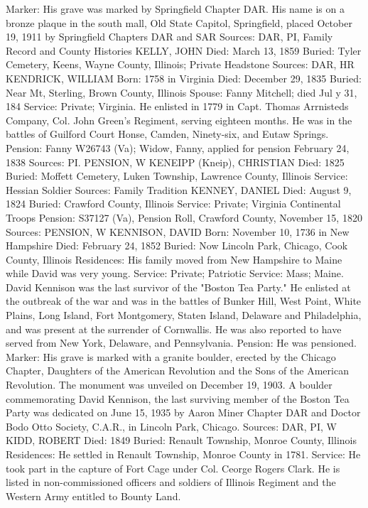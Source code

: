 Marker: His grave was marked by Springfield Chapter DAR. His name is on a bronze plaque in the south mall, Old State Capitol, Springfield, placed October 19, 1911 by Springfield Chapters DAR and SAR 
Sources: DAR, PI, Family Record and County Histories 
KELLY, JOHN 
Died: March 13, 1859
Buried: Tyler Cemetery, Keens, Wayne County, Illinois; Private Headstone 
Sources: DAR, HR 
KENDRICK, WILLIAM 
Born: 1758 in Virginia
Died: December 29, 1835
Buried: Near Mt, Sterling, Brown County, Illinois
Spouse: Fanny Mitchell; died Jul y 31, 184 
Service: Private; Virginia. He enlisted in 1779 in Capt. Thomas Arrnisteds Company, Col. John Green's Regiment, serving eighteen months. He was in the battles of Guilford Court Honse, Camden, Ninety-six, and Eutaw Springs. Pension: Fanny W26743 (Va); Widow, Fanny, applied for pension February 24, 1838 
Sources: PI. PENSION, W 
KENEIPP (Kneip), CHRISTIAN
Died: 1825
Buried: Moffett Cemetery, Luken Township, Lawrence County, Illinois
Service: Hessian Soldier
Sources: Family Tradition 
KENNEY, DANIEL
Died: August 9, 1824
Buried: Crawford County, Illinois
Service: Private; Virginia Continental Troops Pension: S37127 (Va), Pension Roll, Crawford County, November 15, 1820
Sources: PENSION, W 
KENNISON, DAVID
Born: November 10, 1736 in New Hampshire 
Died: February 24, 1852
Buried: Now Lincoln Park, Chicago, Cook County, Illinois 
Residences: His family moved from New Hampshire to Maine while David was very young. 
Service: Private; Patriotic
Service: Mass; Maine. David Kennison was the last survivor of the "Boston Tea Party." He enlisted at the outbreak of the war and was in the battles of Bunker Hill, West Point, White Plains, Long Island, Fort Montgomery, Staten Island, Delaware and Philadelphia, and was present at the surrender of Cornwallis. He was also reported to have served from New York, Delaware, and Pennsylvania. 
Pension: He was pensioned. 
Marker: His grave is marked with a granite boulder, erected by the Chicago Chapter, Daughters of the American Revolution and the Sons of the American Revolution. The monument was unveiled on December 19, 1903. A boulder commemorating David Kennison, the last surviving member of the Boston Tea Party was dedicated on June 15, 1935 by Aaron Miner Chapter DAR and Doctor Bodo Otto Society, C.A.R., in Lincoln Park, Chicago. 
Sources: DAR, PI, W 
KIDD, ROBERT
Died: 1849
Buried: Renault Township, Monroe County, Illinois
Residences: He settled in Renault Township, Monroe County in 1781.
Service: He took part in the capture of Fort Cage under Col. Ceorge Rogers Clark. He is listed in non-commissioned officers and soldiers of Illinois Regiment and the Western Army entitled to Bounty Land.
